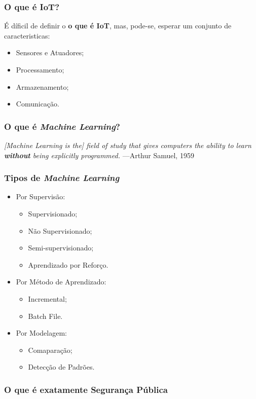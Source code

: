 \begin{frame}
	\frametitle{O que é IoT?}

	É díficil de definir o \textbf{o que é IoT}, mas, pode-se, 
	esperar um conjunto de caracteristicas:
	\begin{itemize}
	\item Sensores e Atuadores;
	\item Processamento;
	\item Armazenamento;
	\item Comunicação.
	\end{itemize}
\end{frame}

\begin{frame}
	\frametitle{O que é \textit{Machine Learning}?}
	\textit{[Machine  Learning  is  the]  field  of  study  that  gives  computers  the  ability  to  learn
	\textbf{without} being explicitly programmed.}
	—Arthur Samuel, 1959
\end{frame}

\begin{frame}
	\frametitle{Tipos de \textit{Machine Learning}}
	\begin{itemize}[<+->]
		\item Por Supervisão:
			\begin{itemize}[<+->]
				\item Supervisionado;
				\item Não Supervisionado;
				\item Semi-supervisionado;
				\item Aprendizado por Reforço.
			\end{itemize}	
		\item Por Método de Aprendizado:
			\begin{itemize}[<+->]
				\item Incremental;
				\item Batch File.
			\end{itemize}
		\item Por Modelagem:
		\begin{itemize}[<+->]
			\item Comaparação;
			\item Detecção de Padrões.
		\end{itemize}
	\end{itemize}	
\end{frame}

\begin{frame}
	\frametitle{O que é exatamente Segurança Pública}
\end{frame}